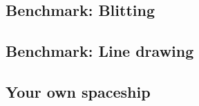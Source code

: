 \documentclass[
	letterpaper, %
	10pt, %
]{CSUniSchoolLabReport}
\begin{document}
\subsection{Benchmark: Blitting}

\subsection{Benchmark: Line drawing}

\subsection{Your own spaceship}

\subsection*{}

\printbibliography %

\end{document}
